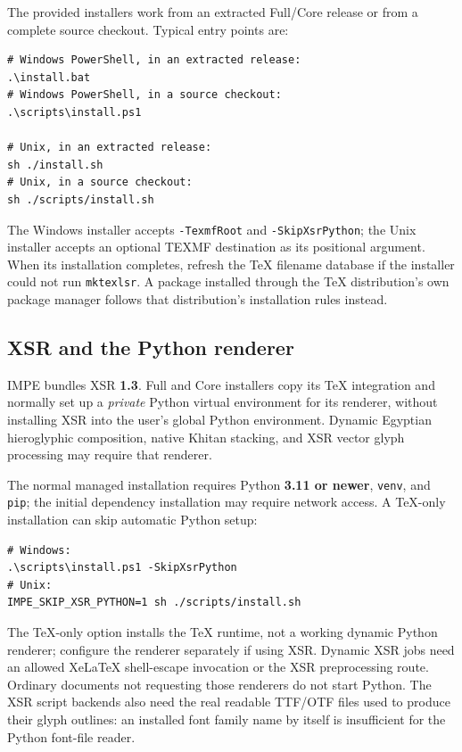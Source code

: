 \documentclass[11pt]{impeart}
\begin{document}
The provided installers work from an extracted Full/Core release or from a
complete source checkout. Typical entry points are:

\begin{verbatim}
# Windows PowerShell, in an extracted release:
.\install.bat
# Windows PowerShell, in a source checkout:
.\scripts\install.ps1

# Unix, in an extracted release:
sh ./install.sh
# Unix, in a source checkout:
sh ./scripts/install.sh
\end{verbatim}

The Windows installer accepts \texttt{-TexmfRoot} and
\texttt{-SkipXsrPython}; the Unix installer accepts an optional TEXMF
destination as its positional argument. When its installation completes, refresh
the \TeX{} filename database if the installer could not run
\texttt{mktexlsr}. A package installed through the \TeX{} distribution's own
package manager follows that distribution's installation rules instead.

\subsection{XSR and the Python renderer}

IMPE bundles XSR \textbf{1.3}. Full and Core installers copy its \TeX{}
integration and normally set up a \emph{private} Python virtual environment for
its renderer, without installing XSR into the user's global Python environment.
Dynamic Egyptian hieroglyphic composition, native Khitan stacking, and XSR
vector glyph processing may require that renderer.

The normal managed installation requires Python \textbf{3.11 or newer},
\texttt{venv}, and \texttt{pip}; the initial dependency installation may require
network access. A \TeX{}-only installation can skip automatic Python setup:

\begin{verbatim}
# Windows:
.\scripts\install.ps1 -SkipXsrPython
# Unix:
IMPE_SKIP_XSR_PYTHON=1 sh ./scripts/install.sh
\end{verbatim}

The \TeX{}-only option installs the \TeX{} runtime, not a working dynamic
Python renderer; configure the renderer separately if using XSR. Dynamic XSR
jobs need an allowed XeLaTeX shell-escape invocation or the XSR preprocessing
route. Ordinary documents not requesting those renderers do not start Python.
The XSR script backends also need the real readable TTF/OTF files used to
produce their glyph outlines: an installed font family name by itself is
insufficient for the Python font-file reader.
\end{document}
